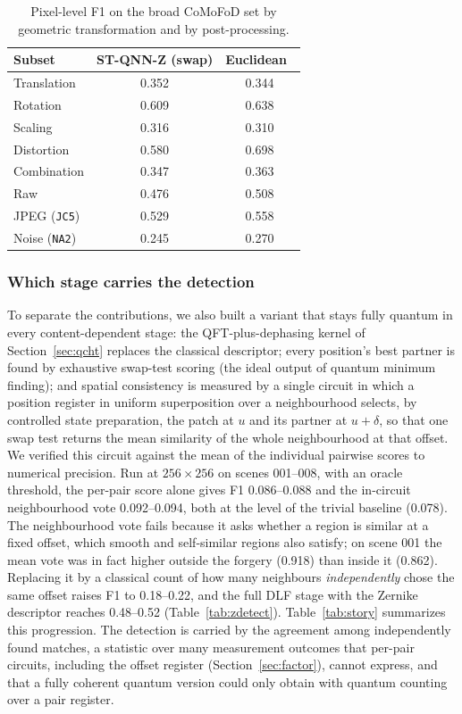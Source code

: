\documentclass[conference]{IEEEtran}
\begin{document}
\begin{table}[t]
\centering
\caption{Pixel-level F1 on the broad CoMoFoD set by geometric transformation and by post-processing.}
\label{tab:zbreak}
\setlength{\tabcolsep}{3.5pt}
\begin{tabular}{lcc}
\toprule
\textbf{Subset} & \textbf{ST-QNN-Z (swap)} & \textbf{Euclidean~\cite{cozzolino2015}}\\
\midrule
Translation & 0.352 & 0.344\\
Rotation & 0.609 & 0.638\\
Scaling & 0.316 & 0.310\\
Distortion & 0.580 & 0.698\\
Combination & 0.347 & 0.363\\
\midrule
Raw & 0.476 & 0.508\\
JPEG (\texttt{JC5}) & 0.529 & 0.558\\
Noise (\texttt{NA2}) & 0.245 & 0.270\\
\bottomrule
\end{tabular}
\end{table}

\subsubsection{Which stage carries the detection}
To separate the contributions, we also built a variant that stays fully quantum in every content-dependent stage: the QFT-plus-dephasing kernel of Section~\ref{sec:qcht} replaces the classical descriptor; every position's best partner is found by exhaustive swap-test scoring (the ideal output of quantum minimum finding); and spatial consistency is measured by a single circuit in which a position register in uniform superposition over a neighbourhood selects, by controlled state preparation, the patch at $u$ and its partner at $u+\delta$, so that one swap test returns the mean similarity of the whole neighbourhood at that offset. We verified this circuit against the mean of the individual pairwise scores to numerical precision. Run at $256\times256$ on scenes 001--008, with an oracle threshold, the per-pair score alone gives F1 0.086--0.088 and the in-circuit neighbourhood vote 0.092--0.094, both at the level of the trivial baseline (0.078). The neighbourhood vote fails because it asks whether a region is similar at a fixed offset, which smooth and self-similar regions also satisfy; on scene 001 the mean vote was in fact higher outside the forgery (0.918) than inside it (0.862). Replacing it by a classical count of how many neighbours \emph{independently} chose the same offset raises F1 to 0.18--0.22, and the full DLF stage with the Zernike descriptor reaches 0.48--0.52 (Table~\ref{tab:zdetect}). Table~\ref{tab:story} summarizes this progression. The detection is carried by the agreement among independently found matches, a statistic over many measurement outcomes that per-pair circuits, including the offset register (Section~\ref{sec:factor}), cannot express, and that a fully coherent quantum version could only obtain with quantum counting over a pair register.
\end{document}
